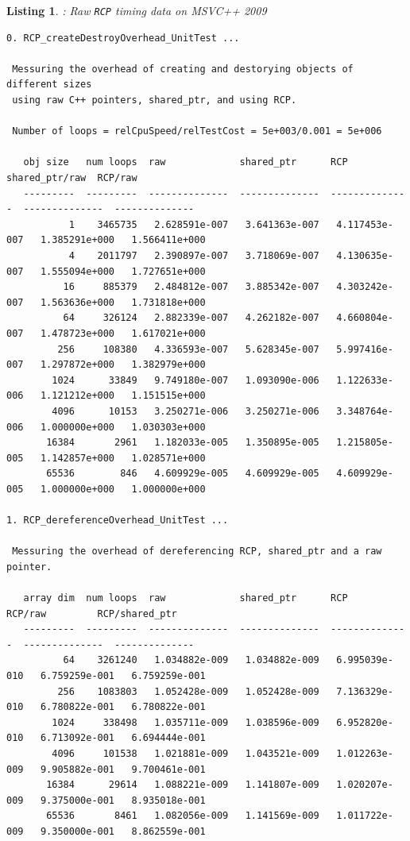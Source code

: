 \documentclass[pdf,ps2pdf,11pt]{SANDreport}
\newtheorem{listing}{Listing}
\begin{document}
\begin{listing}: Raw {}\texttt{RCP} timing data on MSVC++ 2009  \\
\label{listing:RCP-MSVC-Timings}
{\scriptsize\begin{verbatim}
0. RCP_createDestroyOverhead_UnitTest ... 
 
 Messuring the overhead of creating and destorying objects of different sizes
 using raw C++ pointers, shared_ptr, and using RCP.
 
 Number of loops = relCpuSpeed/relTestCost = 5e+003/0.001 = 5e+006
 
   obj size   num loops  raw             shared_ptr      RCP             shared_ptr/raw  RCP/raw       
   ---------  ---------  --------------  --------------  --------------  --------------  --------------
           1    3465735   2.628591e-007   3.641363e-007   4.117453e-007   1.385291e+000   1.566411e+000
           4    2011797   2.390897e-007   3.718069e-007   4.130635e-007   1.555094e+000   1.727651e+000
          16     885379   2.484812e-007   3.885342e-007   4.303242e-007   1.563636e+000   1.731818e+000
          64     326124   2.882339e-007   4.262182e-007   4.660804e-007   1.478723e+000   1.617021e+000
         256     108380   4.336593e-007   5.628345e-007   5.997416e-007   1.297872e+000   1.382979e+000
        1024      33849   9.749180e-007   1.093090e-006   1.122633e-006   1.121212e+000   1.151515e+000
        4096      10153   3.250271e-006   3.250271e-006   3.348764e-006   1.000000e+000   1.030303e+000
       16384       2961   1.182033e-005   1.350895e-005   1.215805e-005   1.142857e+000   1.028571e+000
       65536        846   4.609929e-005   4.609929e-005   4.609929e-005   1.000000e+000   1.000000e+000

1. RCP_dereferenceOverhead_UnitTest ... 
 
 Messuring the overhead of dereferencing RCP, shared_ptr and a raw pointer.
 
   array dim  num loops  raw             shared_ptr      RCP             RCP/raw         RCP/shared_ptr
   ---------  ---------  --------------  --------------  --------------  --------------  --------------
          64    3261240   1.034882e-009   1.034882e-009   6.995039e-010   6.759259e-001   6.759259e-001
         256    1083803   1.052428e-009   1.052428e-009   7.136329e-010   6.780822e-001   6.780822e-001
        1024     338498   1.035711e-009   1.038596e-009   6.952820e-010   6.713092e-001   6.694444e-001
        4096     101538   1.021881e-009   1.043521e-009   1.012263e-009   9.905882e-001   9.700461e-001
       16384      29614   1.088221e-009   1.141807e-009   1.020207e-009   9.375000e-001   8.935018e-001
       65536       8461   1.082056e-009   1.141569e-009   1.011722e-009   9.350000e-001   8.862559e-001


\end{verbatim}}
\end{listing}
\end{document}
